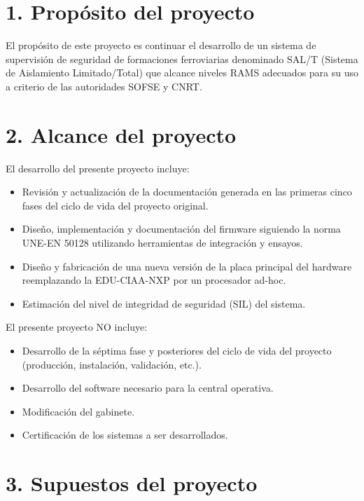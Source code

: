 \documentclass[11pt]{charter}
\begin{document}
\newpage

\section{1. Propósito del proyecto}
\label{sec:proposito}

El propósito de este proyecto es continuar el desarrollo de un sistema de supervisión de seguridad de formaciones ferroviarias 
denominado SAL/T (Sistema de Aislamiento Limitado/Total) que alcance niveles RAMS adecuados para su uso a criterio de las autoridades SOFSE y CNRT.

\section{2. Alcance del proyecto}
\label{sec:alcance}

El desarrollo del presente proyecto incluye:

\begin{itemize}
\item Revisión y actualización de la documentación generada en las primeras cinco fases del ciclo de vida del proyecto
original.
\item Diseño, implementación y documentación del firmware siguiendo la norma UNE-EN 50128 utilizando herramientas de integración y ensayos. 
\item Diseño y fabricación de una nueva versión de la placa principal del hardware reemplazando la EDU-CIAA-NXP por un procesador ad-hoc.
\item Estimación del nivel de integridad de seguridad (SIL) del sistema.
\end{itemize}

El presente proyecto NO incluye:

\begin{itemize}
\item Desarrollo de la séptima fase y posteriores del ciclo de vida del proyecto (producción, instalación, validación, etc.).
\item Desarrollo del software necesario para la central operativa.
\item Modificación del gabinete.
\item Certificación de los sistemas a ser desarrollados.
\end{itemize}

\section{3. Supuestos del proyecto}
\label{sec:supuestos}
\end{document}
